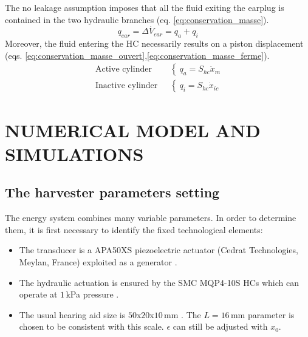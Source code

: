 \documentclass[3p,twocolumn,preprint]{elsarticle}
\begin{document}
The no leakage assumption imposes that all the fluid exiting the earplug is contained in the two hydraulic branches (eq. \ref{eq:conservation_masse}).
\begin{equation}
	q_{ear} = \dot{\Delta V_{ear}} = q_a + q_i
	\label{eq:conservation_masse}
\end{equation}
Moreover, the fluid entering the HC necessarily results on a piston displacement (eqs. \ref{eq:conservation_masse_ouvert},\ref{eq:conservation_masse_ferme}).
\begin{align}
	\text{Active cylinder ~}& \left\{~
	q_a = S_{hc} \dot{x}_m
	\right.
	\label{eq:conservation_masse_ouvert}\\
	\text{Inactive cylinder ~}& \left\{~
	q_i = S_{hc} \dot{x}_{ic}
	\right.
	\label{eq:conservation_masse_ferme}
\end{align}
\section{NUMERICAL MODEL AND SIMULATIONS}
\label{sec:NUMERICAL MODEL AND SIMULATIONS}
	\subsection{The harvester parameters setting}	
	\label{subsec:The harvester setting}
The energy system combines many variable parameters. In order to determine them, it is first necessary to identify the fixed technological elements: 
\begin{itemize}
	\item The transducer is a APA50XS piezoelectric actuator (Cedrat Technologies, Meylan, France) exploited as a generator \cite{CEDRATTECHNOLOGIES2022}.
	\item The hydraulic actuation is ensured by the SMC MQP4-10S HCs which can operate at $1$\,kPa pressure \cite{SMC2022}.
	\item The usual hearing aid size is $50$x$20$x$10$\,mm \cite{Quattro2019}. The \mbox{$L=16$\,mm} parameter is chosen to be consistent with this scale. $\epsilon$ can still be adjusted with $x_0$.
\end{itemize}
\end{document}

